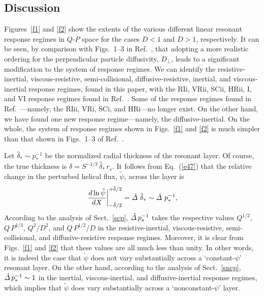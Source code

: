 \documentclass[12pt,prb,aps]{revtex4-1}
\begin{document}
\subsection{Discussion}\label{dis1}
Figures~\ref{f1} and \ref{f2} show the extents of the various different linear resonant response regimes in $Q$-$P$ space for the
cases $D<1$ and $D>1$, respectively. It can be seen, by comparison with Figs.~1--3 in Ref.~, that
adopting a more realistic ordering for the perpendicular particle diffusivity, $D_\perp$, leads to a significant
modification to the system of response regimes. We can identify the
resistive-inertial, viscous-resistive, semi-collisional, diffusive-resistive, inertial, and viscous-inertial response regimes, found in this paper, with
the RIi, VRii, SCii, HRii, I, and VI response regimes found in Ref.~. Some of the response regimes
found in Ref.~---namely, the RIii, VRi, SCi, and HRi---no longer exist. On the other hand, we have
found one new response regime---namely, the diffusive-inertial. On the whole, the system of response regimes shown
in Figs.~\ref{f1} and \ref{f2} is much simpler than that shown in Figs.~1--3 of Ref.~.

Let $\hat{\delta}_\ast\sim p_\ast^{-1}$ be the normalized radial thickness of the resonant layer.  Of course, the true thickness is
$\delta = S^{-1/3}\,\hat{\delta}_\ast\,r_s$.  It follows from
Eq.~(\ref{e47}) that the relative change in the perturbed helical flux, $\tilde{\psi}$, across the layer
is
\begin{equation}
\left.\frac{d\ln\tilde{\psi}}{dX}\right|_{-\hat{\delta}/2}^{+\hat{\delta}/2} = \hat{\mit\Delta}\,\,\hat{\delta}_\ast\sim \hat{\mit\Delta}\,\,p_\ast^{-1},
\end{equation}
According to the  analysis of Sect.~\ref{scp}, $\hat{\mit\Delta}\,p_\ast^{-1}$ takes the respective values $Q^{1/2}$, $Q\,P^{1/3}$, 
$Q^2/D^2$, and $Q\,P^{1/2}/D$ in the resistive-inertial, viscous-resistive, semi-collisional, and
diffusive-resistive response regimes. Moreover, it is clear from Figs.~\ref{f1} and \ref{f2} that these values are all
much less than unity. In other words, it is indeed the case that $\tilde{\psi}$ does not vary substantially across a
`constant-$\psi$' resonant layer. On the other hand, according to the analysis of Sect.~\ref{sncp}, $\hat{\mit\Delta}\,p_\ast^{-1}\sim 1$ in the inertial,
viscous-inertial, and diffusive-inertial response regimes, which implies that $\tilde{\psi}$ does vary substantially
across a `nonconstant-$\psi$' layer. 
\end{document}

